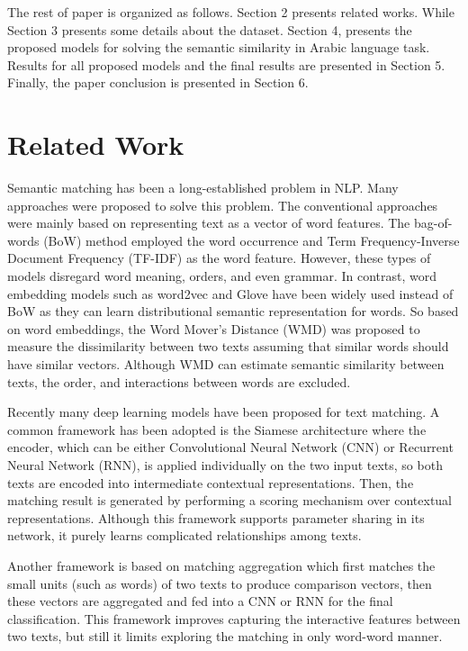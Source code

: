 \documentclass[11pt,a4paper]{article}
\begin{document}
The rest of paper is organized as follows. Section 2 presents related works. While Section 3 presents  some details about the dataset. Section 4, presents the proposed models for solving the semantic similarity in Arabic language task. Results for all proposed models and the final results are presented in Section 5. Finally, the paper conclusion is presented in Section 6.



\section{Related Work}
Semantic matching has been a long-established problem in NLP. Many approaches were proposed to solve this problem. The conventional approaches were mainly based on representing text as a vector of word features. The bag-of-words (BoW) method \cite{wu2008interpreting} employed the word occurrence and Term Frequency-Inverse Document Frequency (TF-IDF) \cite{paltoglou2010study}  as the word feature. However, these types of models disregard word meaning, orders, and even grammar. In contrast, word embedding models such as word2vec \cite{mikolov2013efficient} and Glove \cite{pennington2014glove} have been widely used instead of BoW as they can learn distributional semantic representation for words. So based on word embeddings, the Word Mover’s Distance (WMD) \cite{kusner2015word} was proposed to measure the dissimilarity between two texts assuming that similar words should have similar vectors. Although WMD can estimate semantic similarity between texts, the order, and interactions between words are excluded. 

Recently many deep learning models have been proposed for text matching. A common framework has been adopted is the Siamese architecture \cite{mueller2016siamese,pang2016text, severyn2015learning,wang2017bilateral} where the encoder, which can be either Convolutional Neural Network (CNN) or Recurrent Neural Network (RNN), is applied individually on the two input texts, so both texts are encoded into intermediate contextual representations. Then, the matching result is generated by performing a scoring mechanism over contextual representations. Although this framework supports parameter sharing in its network, it purely learns complicated relationships among texts.

Another framework is based on matching aggregation  \cite{wang2016compare} which first matches the small units (such as words) of two texts to produce comparison vectors, then these vectors are aggregated and fed into a CNN or RNN for the final classification. This framework improves capturing the interactive features between two texts, but still it limits exploring the matching in only word-word manner.
\end{document}
